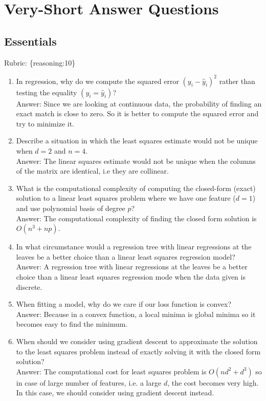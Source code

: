 \documentclass{article}
\def\rubric#1{\gre{Rubric: \{#1\}}}{}
\def\blu#1{{\color{blu}#1}}
\def\gre#1{{\color{gre}#1}}
\def\enum#1{\begin{enumerate}#1\end{enumerate}}
\begin{document}
\section{Very-Short Answer Questions}

\subsection{Essentials}
\rubric{reasoning:10}

\enum{
\item In regression, why do we compute the squared error $(y_i - \hat{y}_i)^2$ rather than testing the equality $(y_i = \hat{y}_i)$? \\
\blu{Answer:} Since we are looking at continuous data, the probability of finding an exact match is close to zero. So it is better to compute the squared error and try to minimize it.
\item Describe a situation in which the least squares estimate would not be unique when $d=2$ and $n=4$. \\
\blu{Answer:} The linear squares estimate would not be unique when the columns of the matrix are identical, i.e they are collinear.
\item What is the computational complexity of computing the closed-form (exact) solution to a linear least squares problem where we have one feature ($d = 1$) and use polynomial basis of degree $p$? \\
\blu{Answer:} The computational complexity of finding the closed form solution is $O(n^3 + np)$.
\item In what circumstance would a regression tree with linear regressions at the leaves be a better choice
than a linear least squares regression model? \\
\blu{Answer:} A regression tree with linear regressions at the leaves be a better choice than a linear least squares regression mode when the data given is discrete.
\item When fitting a model, why do we care if our loss function is convex? \\
\blu{Answer:} Because in a convex function, a local minima is global minima so it becomes easy to find the minimum.
\item When should we consider using gradient descent to approximate the solution to the least squares problem instead of exactly solving it with the closed form solution? \\
\blu{Answer:} The computational cost for least squares problem is $O(nd^2 + d^3)$  so in case of large number of features, i.e. a large $d$, the cost becomes very high. In this case, we should consider using gradient descent instead.
}
\end{document}
